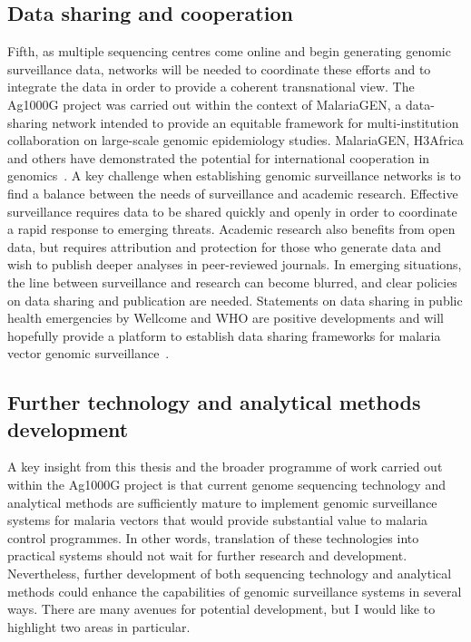 \documentclass[a4paper,11pt,abstracton,hidelinks]{scrartcl}
\begin{document}
\subsection{Data sharing and cooperation}


Fifth, as multiple sequencing centres come online and begin generating genomic surveillance data, networks will be needed to coordinate these efforts and to integrate the data in order to provide a coherent transnational view.
%
The Ag1000G project was carried out within the context of MalariaGEN, a data-sharing network intended to provide an equitable framework for multi-institution collaboration on large-scale genomic epidemiology studies.
%
MalariaGEN, H3Africa and others have demonstrated the potential for international cooperation in genomics~\parencite{Mulder2018}.
%
A key challenge when establishing genomic surveillance networks is to find a balance between the needs of surveillance and academic research.
%
Effective surveillance requires data to be shared quickly and openly in order to coordinate a rapid response to emerging threats.
%
Academic research also benefits from open data, but requires attribution and protection for those who generate data and wish to publish deeper analyses in peer-reviewed journals.
%
In emerging situations, the line between surveillance and research can become blurred, and clear policies on data sharing and publication are needed.
%
Statements on data sharing in public health emergencies by Wellcome and WHO are positive developments and will hopefully provide a platform to establish data sharing frameworks for malaria vector genomic surveillance~\parencite{WHO2015SDPHE,Dye2016,Wellcome2016,Wellcome2020}.


\subsection{Further technology and analytical methods development}


A key insight from this thesis and the broader programme of work carried out within the Ag1000G project is that current genome sequencing technology and analytical methods are sufficiently mature to implement genomic surveillance systems for malaria vectors that would provide substantial value to malaria control programmes.
%
In other words, translation of these technologies into practical systems should not wait for further research and development.
%
Nevertheless, further development of both sequencing technology and analytical methods could enhance the capabilities of genomic surveillance systems in several ways.
%
There are many avenues for potential development, but I would like to highlight two areas in particular.
\end{document}
